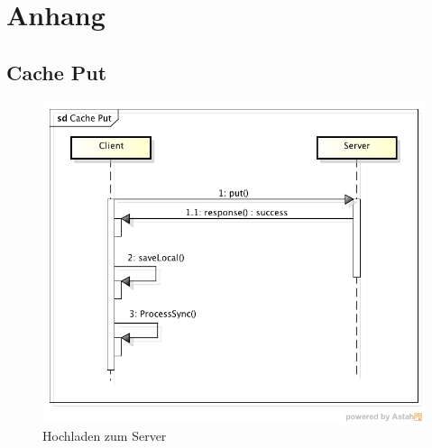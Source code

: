 \chapter{Anhang}
\label{cha:anhang}



\section{Cache Put}

\begin{figure}[h]
\centering
\includegraphics[width=0.8\linewidth]{content/images/Cache-Put}
\caption{Hochladen zum Server}
\label{pic:cachePut}
\end{figure}